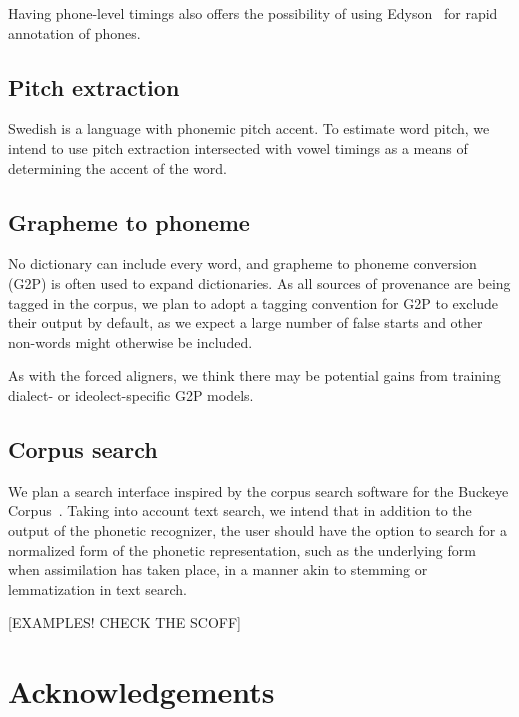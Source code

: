 \documentclass{Interspeech}
\begin{document}
Having phone-level timings also offers the possibility of using Edyson~\cite{fallgren2021human} for rapid annotation of phones.

\subsection{Pitch extraction}

Swedish is a language with phonemic pitch accent. To estimate word pitch, we intend to use pitch extraction intersected with vowel timings as a means of determining the accent of the word.


\subsection{Grapheme to phoneme}

No dictionary can include every word, and grapheme to phoneme conversion (G2P) is often used to expand dictionaries. As all sources of provenance are being tagged in the corpus, we plan to adopt a tagging convention for G2P to exclude their output by default, as we expect a large number of false starts and other non-words might otherwise be included.

As with the forced aligners, we think there may be potential gains from training dialect- or ideolect-specific G2P models.

\subsection{Corpus search}

We plan a search interface inspired by the corpus search software for the Buckeye Corpus~\cite{pitt2007buckeye}. Taking into account text search, we intend that in addition to the output of the phonetic recognizer, the user should have the option to search for a normalized form of the phonetic representation, such as the underlying form when assimilation has taken place, in a manner akin to stemming or lemmatization in text search.


[EXAMPLES! CHECK THE SCOFF]



\section{Acknowledgements}





\end{document}
